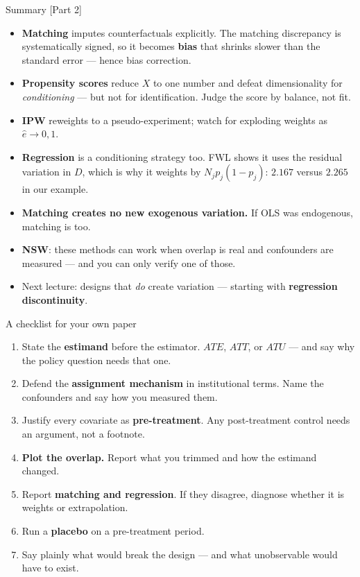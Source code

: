 \documentclass[
  11pt,
  ignorenonframetext,
  aspectratio=169,
]{beamer}
\providecommand{\tightlist}{%
  \setlength{\itemsep}{0pt}\setlength{\parskip}{0pt}}
\begin{document}
\begin{frame}{Summary {[}Part 2{]}}
\protect{}\label{summary-part-2}
\begin{itemize}
\tightlist
\item
  \textbf{Matching} imputes counterfactuals explicitly. The matching
  discrepancy is systematically signed, so it becomes \textbf{bias} that
  shrinks slower than the standard error --- hence bias correction.
\item
  \textbf{Propensity scores} reduce \(X\) to one number and defeat
  dimensionality for \emph{conditioning} --- but not for identification.
  Judge the score by balance, not fit.
\item
  \textbf{IPW} reweights to a pseudo-experiment; watch for exploding
  weights as \(\hat e \to 0, 1\).
\item
  \textbf{Regression} is a conditioning strategy too. FWL shows it uses
  the residual variation in \(D\), which is why it weights by
  \(N_j p_j(1-p_j)\): \(2.167\) versus \(2.265\) in our example.
\item
  \textbf{Matching creates no new exogenous variation.} If OLS was
  endogenous, matching is too.
\item
  \textbf{NSW}: these methods can work when overlap is real and
  confounders are measured --- and you can only verify one of those.
\item
  Next lecture: designs that \emph{do} create variation --- starting
  with \textbf{regression discontinuity}.
\end{itemize}
\end{frame}

\begin{frame}{A checklist for your own paper}
\protect{}\label{a-checklist-for-your-own-paper}
\begin{enumerate}
\tightlist
\item
  State the \textbf{estimand} before the estimator. \(ATE\), \(ATT\), or
  \(ATU\) --- and say why the policy question needs that one.
\item
  Defend the \textbf{assignment mechanism} in institutional terms. Name
  the confounders and say how you measured them.
\item
  Justify every covariate as \textbf{pre-treatment}. Any post-treatment
  control needs an argument, not a footnote.
\item
  \textbf{Plot the overlap.} Report what you trimmed and how the
  estimand changed.
\item
  Report \textbf{matching and regression}. If they disagree, diagnose
  whether it is weights or extrapolation.
\item
  Run a \textbf{placebo} on a pre-treatment period.
\item
  Say plainly what would break the design --- and what unobservable
  would have to exist.
\end{enumerate}
\end{frame}
\end{document}
